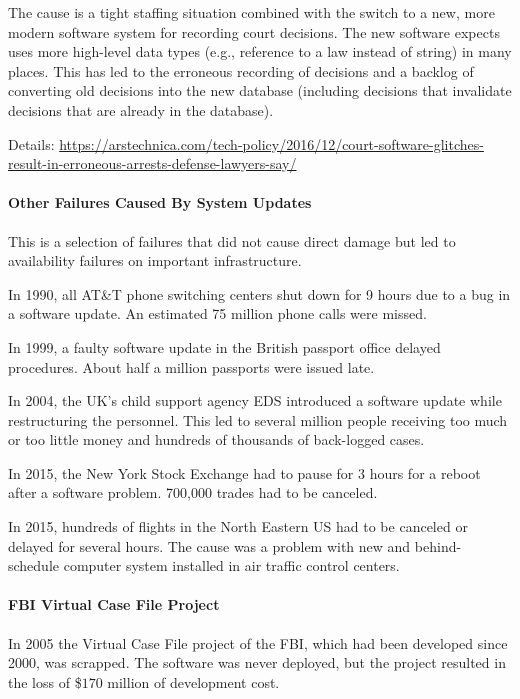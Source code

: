 The cause is a tight staffing situation combined with the switch to a new, more modern software system for recording court decisions.
The new software expects uses more high-level data types (e.g., reference to a law instead of string) in many places.
This has led to the erroneous recording of decisions and a backlog of converting old decisions into the new database (including decisions that invalidate decisions that are already in the database).

Details: \url{https://arstechnica.com/tech-policy/2016/12/court-software-glitches-result-in-erroneous-arrests-defense-lawyers-say/}

\paragraph{Other Failures Caused By System Updates}
This is a selection of failures that did not cause direct damage but led to availability failures on important infrastructure.

In 1990, all AT\&T phone switching centers shut down for 9 hours due to a bug in a software update.
An estimated 75 million phone calls were missed.

In 1999, a faulty software update in the British passport office delayed procedures.
About half a million passports were issued late.

In 2004, the UK's child support agency EDS introduced a software update while restructuring the personnel.
This led to several million people receiving too much or too little money and hundreds of thousands of back-logged cases.

In 2015, the New York Stock Exchange had to pause for $3$ hours for a reboot after a software problem.
700,000 trades had to be canceled.

In 2015, hundreds of flights in the North Eastern US had to be canceled or delayed for several hours.
The cause was a problem with new and behind-schedule computer system installed in air traffic control centers.

\paragraph{FBI Virtual Case File Project}
In 2005 the Virtual Case File project of the FBI, which had been developed since 2000, was scrapped.
The software was never deployed, but the project resulted in the loss of \$$170$ million of development cost.

